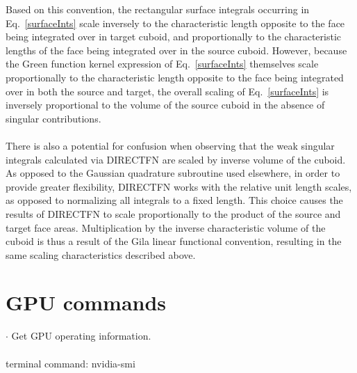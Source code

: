 \documentclass[reprint,aps,prb]{revtex4-2}
\begin{document}
Based on this convention, the rectangular surface integrals occurring in Eq.~\eqref{surfaceInts} scale inversely to the characteristic length opposite to the face being integrated over in target cuboid, and proportionally to the characteristic lengths of the face being integrated over in the source cuboid. 
However, because the Green function kernel expression of Eq.~\eqref{surfaceInts} themselves scale proportionally to the characteristic length opposite to the face being integrated over in both the source and target, the overall scaling of Eq.~\eqref{surfaceInts} is inversely proportional to the volume of the source cuboid in the absence of singular contributions. 
\\ \\
There is also a potential for confusion when observing that the weak singular integrals calculated via  DIRECTFN are scaled by inverse volume of the cuboid. 
As opposed to the Gaussian quadrature subroutine used elsewhere, in order to provide greater flexibility, DIRECTFN works with the relative unit length scales, as opposed to normalizing all integrals to a fixed length. 
This choice causes the results of DIRECTFN to scale proportionally to the product of the source and target face areas. 
Multiplication by the inverse characteristic volume of the cuboid is thus a result of the Gila linear functional convention, resulting in the same scaling characteristics described above.
\section{GPU commands}
\noindent
$\cdot$ Get GPU operating information. 
\\ \\
terminal command: nvidia-smi
\end{document}
